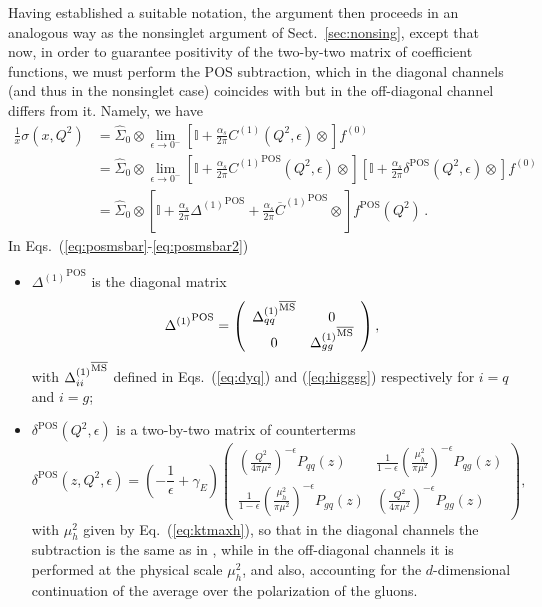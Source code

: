 Having established a suitable notation, the argument then proceeds
in an analogous way as the nonsinglet argument of
Sect.~\ref{sec:nonsing}, except that now, in order to guarantee
positivity of the two-by-two matrix of coefficient functions, we must
perform the POS subtraction, which in the diagonal
channels (and thus in the nonsinglet case) coincides with \msbar{} but
in the off-diagonal channel differs from it.
Namely, we have
\begin{align}
\frac{1}{x} \sigma(x,Q^2)&= \hat \Sigma_0\otimes
\lim_{\epsilon\to
  0^-}\left[\mathbb{I}
    +\frac{\alpha_s}{2\pi} C^{(1)}(Q^2,\epsilon) \otimes\right]
    f^{(0)} \label{eq:posmsbar} \\
&= \hat \Sigma_0\otimes
\lim_{\epsilon\to
  0^-}\left[\mathbb{I}
  +\frac{\alpha_s}{2\pi} {C^{(1)}}^{{\textrm{POS}}}(Q^2,\epsilon) \otimes\right]
\left[\mathbb{I}
    +\frac{\alpha_s}{2\pi} \delta^{{\textrm{POS}}} (Q^2,\epsilon)\otimes\right]
    f^{(0)} \label{eq:posmsbar1} \\
    &=  \hat \Sigma_0\otimes
\left[\mathbb{I}+ \frac{\alpha_s}{2\pi} {\Delta^{(1)}}^{{\textrm{POS}}}
  +\frac{\alpha_s}{2\pi}    {\overline{C}^{(1)}}^{{\textrm{POS}}} \otimes
  \right] 
     f^{{\textrm{POS}}}(Q^2) \,. \label{eq:posmsbar2}
\end{align}
In Eqs.~(\ref{eq:posmsbar}-\ref{eq:posmsbar2})\begin{itemize}
\item $ {\Delta^{(1)}}^{{\textrm{POS}}}$ is the diagonal matrix
\begin{equation}\label{eq:Deltamat}
  {\Delta^{(1)}}^{{\textrm{POS}}}=\left(\begin{array}{cc} {\Delta_{qq}^{(1)}}^{{\overline{\textrm{{MS}}}}} &
   0 \\0 & {\Delta_{gg}^{(1)}}^{{\overline{\textrm{{MS}}}}} \end{array}\right),
\end{equation}
with  ${\Delta_{ii}^{(1)}}^{{\overline{\textrm{{MS}}}}}$ defined in Eqs.~(\ref{eq:dyq}) and
(\ref{eq:higgsg}) respectively for $i=q$ and $i=g$;
\item $\delta^{{\textrm{POS}}} (Q^2,\epsilon)$ is a two-by-two matrix of
  counterterms
\begin{equation}\label{eq:deltamat}
 \delta^{{\textrm{POS}}} (z,Q^2,\epsilon)= \left(-\frac 1
    {\epsilon}+\gamma_E\right) \left(\begin{array}{cc}  \left(\frac{Q^2}{4\pi
      \mu^2}\right)^{-\epsilon} P_{qq}(z) & \frac{1}{1-\epsilon}\left(\frac{\mu_h^2}{\pi\mu^2}\right)^{-\epsilon} 
  P_{qg}(z)   \\\frac{1}{1-\epsilon}\left(\frac{\mu_h^2}{\pi\mu^2}\right)^{-\epsilon} P_{gq}(z)  & \left(\frac{Q^2}{4\pi
      \mu^2}\right)^{-\epsilon} P_{gg}(z)  \end{array}\right),
\end{equation}
with $\mu_h^2$ given by  Eq.~(\ref{eq:ktmaxh}), so that in the
diagonal channels the subtraction is the same as in \msbar{}, while in
the off-diagonal channels it is performed at the physical scale
$\mu_h^2$, and also, accounting for the $d$-dimensional continuation of
the  average over the polarization of the gluons.
  \end{itemize}


